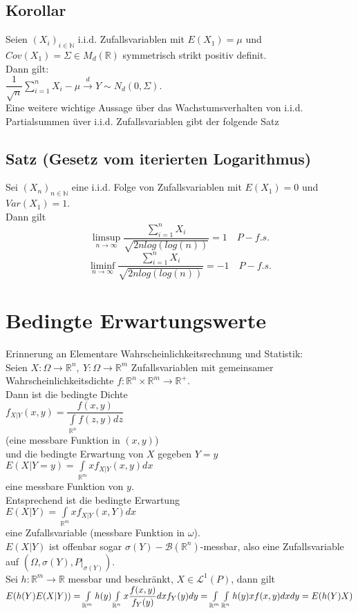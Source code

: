 \documentclass[german,10pt,oneside, fleqn, a4paper]{article}
\newcommand {\R}	{\mathbb{R}}
\newcommand {\N}	{\mathbb{N}}
\newcommand{\ra}{\rightarrow}
\newcommand{\lsup}[1][n]{\limsup\limits_{#1\rightarrow\infty}}
\newcommand{\linf}[1][n]{\liminf\limits_{#1\rightarrow\infty}}
\newcommand{\sm}[2][\infty]{\sum\limits_{#2}^{#1}}
\newcommand{\folge}[3][\N]{\left(#2_#3\right)_{#3\in #1}}
\newcommand{\mc}[1]{\mathcal{#1}}
\newcommand{\lp}[1]{\mc{L}^{#1}}
\newcommand{\1}[1]{1_{#1}}
\newcommand{\2}[1]{\1{\brac{#1}}}
\newcommand{\xr}[2][]{\xrightarrow[#1]{#2}}
\begin{document}
\subsection{Korollar}
\label{5.12}
Seien $\folge{X}{i}$ i.i.d. Zufallsvariablen mit $E(X_1)=\mu$ und $Cov(X_1)=\Sigma\in M_d(\R)$ symmetrisch strikt positiv definit.\\
Dann gilt:\\
$\dfrac{1}{\sqrt{n}}\sm[n]{i=1}{X_i-\mu}\xr{d}Y\sim N_d(0,\Sigma).$\\
Eine weitere wichtige Aussage über das Wachstumsverhalten von i.i.d. Partialsummen üver i.i.d. Zufallsvariablen gibt der folgende Satz

\subsection{Satz (Gesetz vom iterierten Logarithmus)}
\label{5.13}
Sei $\folge{X}{n}$ eine i.i.d. Folge von Zufallsvariablen mit $E(X_1)=0$ und $Var(X_1)=1$.\\
Dann gilt
\[\lsup\dfrac{\sm[n]{i=1}X_i}{\sqrt{2nlog(log(n))}}=1\quad P-f.s.\]
\[\linf\dfrac{\sm[n]{i=1}X_i}{\sqrt{2nlog(log(n))}}=-1\quad P-f.s.\]






\pagebreak
\section{Bedingte Erwartungswerte}
Erinnerung an Elementare Wahrscheinlichkeitsrechnung und Statistik:\\
Seien $X:\Omega\ra\R^n,\ Y:\Omega\ra\R^m$ Zufallsvariablen mit gemeinsamer Wahrscheinlichkeitsdichte $f:\R^n\times\R^m\ra\R^+$.\\
Dann ist die bedingte Dichte\\
$f_{X|Y}(x,y)=\dfrac{f(x,y)}{\int\limits_{\R^n}f(z,y)dz}$\\
(eine messbare Funktion in $(x,y)$)\\
und die bedingte Erwartung von $X$ gegeben $Y=y$\\
$E(X|Y=y)=\int\limits_{\R^m}xf_{X|Y}(x,y)dx$\\
eine messbare Funktion von $y$.\\
Entsprechend ist die bedingte Erwartung \\
$E(X|Y)=\int\limits_{\R^m}xf_{X|Y}(x,Y)dx$\\
eine Zufallsvariable (messbare Funktion in $\omega$).\\
$E(X|Y)$ ist offenbar sogar $\sigma(Y)-\mc{B}(\R^n)$-messbar, also eine Zufallsvariable auf $(\Omega,\sigma(Y),P|_{\sigma(Y)})$.\\
Sei $h:\R^m\ra\R$ messbar und beschränkt, $X\in\lp{1}(P)$, dann gilt\\
$E(h(Y)E(X|Y))=\int\limits_{\R^m}h(y)\int\limits_{\R^n}x\dfrac{f(x,y)}{f_Y(y)}dxf_Y(y)dy\\
=\int\limits_{\R^m}\int\limits_{\R^n}h(y)xf(x,y)dxdy=E(h(Y)X)$
\end{document}
